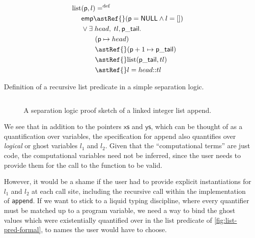 \begin{marginfigure}
    \small
    \centering
    \begin{align*}
        \mathrm{list} &(\mathsf{p}, l) \mathrel{{=}^\mathrm{def}} \\
                      &\mathsf{emp} \astRef{} (\mathsf{p} = \mathsf{NULL} \wedge{} l = []) \\
                      &\vee{} \exists{} \; {head}, \; {tl}, \mathsf{p\_tail}.\\
                      &\qquad (\mathsf{p} \mapsto{} {head}) \\
                      &\qquad \astRef{} (\mathsf{p} + 1 \mapsto{} \mathsf{p\_tail}) \\
                      &\qquad \astRef{} \mathrm{list} (\mathsf{p\_tail}, {tl}) \\
                      &\qquad \astRef{} l = {head} {:}{:} {tl} \\
    \end{align*}
    \caption{Definition of a recursive list predicate in a simple separation
        logic.}\label{fig:list-pred-formal}
\end{marginfigure}

\begin{figure}[h]
    \inputminted[breaklines,mathescape,fontsize=\small]{py}{code/append_annot.py}
    \caption{A separation logic proof sketch of a linked integer list
        append.}\label{fig:append-annot-formal}
\end{figure}

We see that in addition to the pointers $\mathsf{xs}$ and $\mathsf{ys}$, which
can be thought of as a quantification over  variables, the
specification for append also quantifies over \emph{logical} or ghost variables
$l_1$ and $l_2$. Given that the ``computational terms'' are just code, the
computational variables need not be inferred, since the user needs to provide
them for the call to the function to be valid.

However, it would be a shame if the user had to provide explicit instantiations
for $l_1$ and $l_2$ at each call site, including the recursive call within the
implementation of \texttt{append}. If we want to stick to a liquid
typing discipline, where every quantifier must be matched up to a program
variable, we need a way to bind the ghost values which were existentially
quantified over in the $\mathrm{list}$ predicate of
\cref{fig:list-pred-formal}, to names the user would have to choose.

